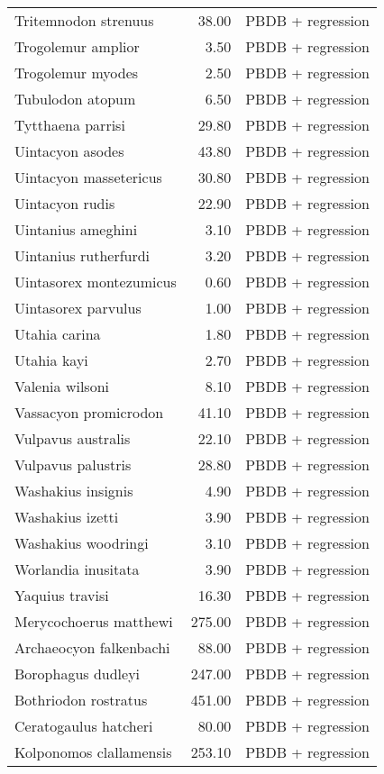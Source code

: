 \begin{table}[ht]
\begin{tabular}{lrl}
  Tritemnodon strenuus & 38.00 & PBDB + regression \\ 
  Trogolemur amplior & 3.50 & PBDB + regression \\ 
  Trogolemur myodes & 2.50 & PBDB + regression \\ 
  Tubulodon atopum & 6.50 & PBDB + regression \\ 
  Tytthaena parrisi & 29.80 & PBDB + regression \\ 
  Uintacyon asodes & 43.80 & PBDB + regression \\ 
  Uintacyon massetericus & 30.80 & PBDB + regression \\ 
  Uintacyon rudis & 22.90 & PBDB + regression \\ 
  Uintanius ameghini & 3.10 & PBDB + regression \\ 
  Uintanius rutherfurdi & 3.20 & PBDB + regression \\ 
  Uintasorex montezumicus & 0.60 & PBDB + regression \\ 
  Uintasorex parvulus & 1.00 & PBDB + regression \\ 
  Utahia carina & 1.80 & PBDB + regression \\ 
  Utahia kayi & 2.70 & PBDB + regression \\ 
  Valenia wilsoni & 8.10 & PBDB + regression \\ 
  Vassacyon promicrodon & 41.10 & PBDB + regression \\ 
  Vulpavus australis & 22.10 & PBDB + regression \\ 
  Vulpavus palustris & 28.80 & PBDB + regression \\ 
  Washakius insignis & 4.90 & PBDB + regression \\ 
  Washakius izetti & 3.90 & PBDB + regression \\ 
  Washakius woodringi & 3.10 & PBDB + regression \\ 
  Worlandia inusitata & 3.90 & PBDB + regression \\ 
  Yaquius travisi & 16.30 & PBDB + regression \\ 
  Merycochoerus matthewi & 275.00 & PBDB + regression \\ 
  Archaeocyon falkenbachi & 88.00 & PBDB + regression \\ 
  Borophagus dudleyi & 247.00 & PBDB + regression \\ 
  Bothriodon rostratus & 451.00 & PBDB + regression \\ 
  Ceratogaulus hatcheri & 80.00 & PBDB + regression \\ 
  Kolponomos clallamensis & 253.10 & PBDB + regression \\ 

\end{tabular}
\end{table}
